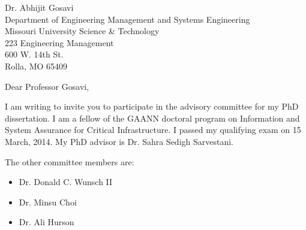 \documentclass{letter}
\begin{document}
\begin{letter}{%
Dr. Abhijit Gosavi\\
Department of Engineering Management and Systems Engineering\\
Missouri University Science \& Technology\\
223 Engineering Management\\
600 W. 14th St.\\
Rolla, MO 65409
}

\opening{%
Dear Professor Gosavi,
}

I am writing to invite you to participate in the advisory committee for my PhD dissertation. I am a fellow of the GAANN doctoral program on Information and System Assurance for Critical Infrastructure. I passed my qualifying exam on 15 March, 2014. My PhD advisor is Dr. Sahra Sedigh Sarvestani.

The other committee members are:
\begin{itemize}
\item Dr. Donald C. Wunsch II
\item Dr. Minsu Choi
\item Dr. Ali Hurson
\end{itemize}


\end{letter}
\end{document}
